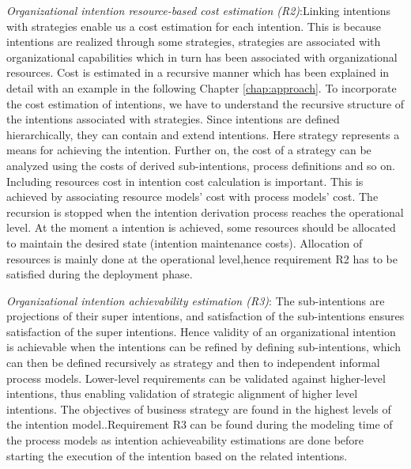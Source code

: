 \textit{Organizational intention resource-based cost estimation (R2)}:Linking intentions with strategies enable us a cost estimation for each intention. This is because intentions are realized through some strategies, strategies are associated with organizational capabilities which in turn has been associated with organizational resources. Cost is estimated in a recursive manner which has been explained in detail with an example in the following Chapter \ref{chap:approach}. To incorporate the cost estimation of intentions, we have to understand the recursive structure of the intentions associated with strategies. Since intentions are defined hierarchically, they can contain and extend intentions. Here strategy represents a means for achieving the intention. Further on, the cost of a strategy can be analyzed using the costs of derived sub-intentions, process definitions and so on. Including resources cost in intention cost calculation is important. This is achieved by associating resource models' cost with process models' cost. The recursion is stopped when the intention derivation process reaches the operational level. At the moment a  intention is achieved, some resources should be allocated to maintain the desired state (intention maintenance costs)\cite{Mandic2010}. Allocation of resources is mainly done at the operational level,hence requirement R2 has to be satisfied during the deployment phase.

\textit{Organizational intention achievability estimation (R3)}: The sub-intentions are projections of their super intentions, and satisfaction of the sub-intentions ensures satisfaction of the super intentions. Hence validity of an organizational intention is achievable when the intentions can be refined by defining sub-intentions, which can then be defined recursively as strategy and then to independent informal process models. Lower-level requirements can be validated against higher-level intentions, thus enabling validation of strategic alignment of  higher level intentions. The objectives of business strategy are found in the highest levels of the intention model.\cite{Bleistein2006}.Requirement R3  can be found during the modeling time of the process models as intention achieveability estimations are done before starting the execution of the intention based on the related intentions.

